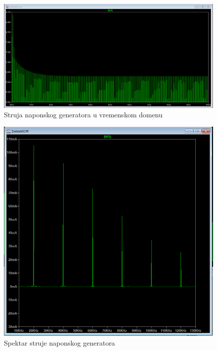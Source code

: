 \documentclass{article}
\begin{document}
\begin{figure}[H]
    \begin{center}
        \includegraphics[width=\textwidth]{Zadatak02_2.png}
        \caption[]{Struja naponskog generatora u vremenskom domenu}
    \end{center}
\end{figure}

\begin{figure}[H]
    \begin{center}
        \includegraphics[width=\textwidth]{Zadatak02_3.png}
        \caption[]{Spektar struje naponskog generatora}
    \end{center}
\end{figure}
\end{document}

